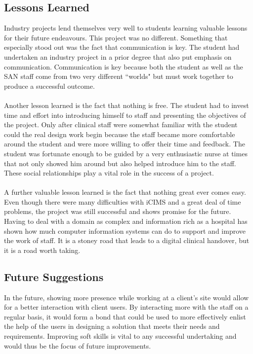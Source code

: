 \subsection{Lessons Learned}
Industry projects lend themselves very well to students learning valuable lessons for their future endeavours. This project was no different. Something that especially stood out was the fact that communication is key. The student had undertaken an industry project in a prior degree that also put emphasis on communication. Communication is key because both the student as well as the SAN staff come from two very different ``worlds" but must work together to produce a successful outcome. 
\\ \\
Another lesson learned is the fact that nothing is free. The student had to invest time and effort into introducing himself to staff and presenting the objectives of the project. Only after clinical staff were somewhat familiar with the student could the real design work begin because the staff became more comfortable around the student and were more willing to offer their time and feedback. The student was fortunate enough to be guided by a very enthusiastic nurse at times that not only showed him around but also helped introduce him to the staff. These social relationships play a vital role in the success of a project.
\\ \\
A further valuable lesson learned is the fact that nothing great ever comes easy. Even though there were many difficulties with iCIMS and a great deal of time problems, the project was still successful and shows promise for the future. Having to deal with a domain as complex and information rich as a hospital has shown how much computer information systems can do to support and improve the work of staff. It is a stoney road that leads to a digital clinical handover, but it is a road worth taking.

\subsection{Future Suggestions}
In the future, showing more presence while working at a client's site would allow for a better interaction with client users. By interacting more with the staff on a regular basis, it would form a bond that could be used to more effectively enlist the help of the users in designing a solution that meets their needs and requirements. Improving soft skills is vital to any successful undertaking and would thus be the focus of future improvements.